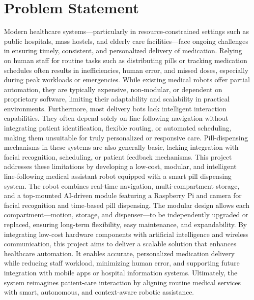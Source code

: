 \vspace{1.5\baselineskip} 

\section{Problem Statement}
Modern healthcare systems—particularly in resource-constrained settings such as public hospitals, mass hostels, and elderly care facilities—face ongoing challenges in ensuring timely, consistent, and personalized delivery of medication. Relying on human staff for routine tasks such as distributing pills or tracking medication schedules often results in inefficiencies, human error, and missed doses, especially during peak workloads or emergencies. While existing medical robots offer partial automation, they are typically expensive, non-modular, or dependent on proprietary software, limiting their adaptability and scalability in practical environments.
Furthermore, most delivery bots lack intelligent interaction capabilities. They often depend solely on line-following navigation without integrating patient identification, flexible routing, or automated scheduling, making them unsuitable for truly personalized or responsive care. Pill-dispensing mechanisms in these systems are also generally basic, lacking integration with facial recognition, scheduling, or patient feedback mechanisms.
This project addresses these limitations by developing a low-cost, modular, and intelligent line-following medical assistant robot equipped with a smart pill dispensing system. The robot combines real-time navigation, multi-compartment storage, and a top-mounted AI-driven module featuring a Raspberry Pi and camera for facial recognition and time-based pill dispensing. The modular design allows each compartment—motion, storage, and dispenser—to be independently upgraded or replaced, ensuring long-term flexibility, easy maintenance, and expandability.
By integrating low-cost hardware components with artificial intelligence and wireless communication, this project aims to deliver a scalable solution that enhances healthcare automation. It enables accurate, personalized medication delivery while reducing staff workload, minimizing human error, and supporting future integration with mobile apps or hospital information systems. Ultimately, the system reimagines patient-care interaction by aligning routine medical services with smart, autonomous, and context-aware robotic assistance.
 

\vspace{1.5\baselineskip} 

